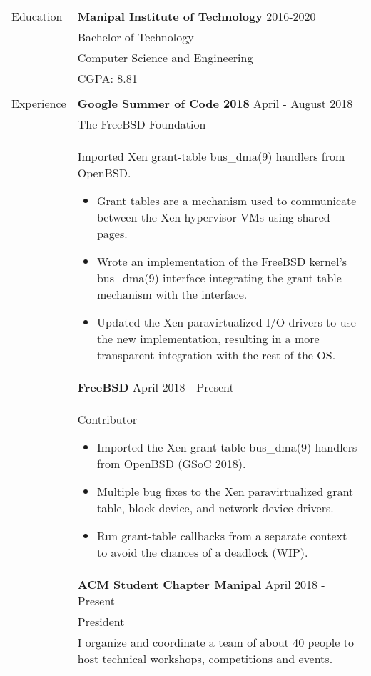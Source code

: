 \documentclass[letterpaper,11pt,oneside]{article}
\begin{document}
\noindent \begin{tabularx}{\textwidth}{l X}
 \Large{Education} & \textbf{Manipal Institute of Technology} \hfill 2016-2020  \\
     & Bachelor of Technology \\
     & Computer Science and Engineering \\
     &  CGPA: 8.81\\
     & \\
 \Large{Experience}    & \textbf{Google Summer of Code 2018} \hfill April - August 2018 \\
    & The FreeBSD Foundation \\
    & Imported Xen grant-table bus\_dma(9) handlers from OpenBSD. \vspace{-1ex}
    \begin{itemize}[label={--}]
    \setlength\itemsep{-0.25em}
        \item Grant tables are a mechanism used to communicate between the Xen hypervisor VMs using shared pages.
        \item Wrote an implementation of the FreeBSD kernel's bus\_dma(9) interface integrating the grant table mechanism with the interface.
        \item Updated the Xen paravirtualized I/O drivers to use the new implementation, resulting in a more transparent integration with the rest of the OS.
    \end{itemize} \\
    & \textbf{FreeBSD} \hfill April 2018 - Present \\
    & Contributor \vspace{-1ex}
    \begin{itemize}[label={--}]
        \setlength\itemsep{-0.25em}
            \item Imported the Xen grant-table bus\_dma(9) handlers from OpenBSD (GSoC 2018).
            \item Multiple bug fixes to the Xen paravirtualized grant table, block device, and network device drivers.
            \item Run grant-table callbacks from a separate context to avoid the chances of a deadlock (WIP).
    \end{itemize} \\
    & \textbf{ACM Student Chapter Manipal} \hfill April 2018 -  Present \\
    & President \\
    & I organize and coordinate a team of about 40 people to host technical workshops, competitions and events. \\

\end{tabularx}
\end{document}
